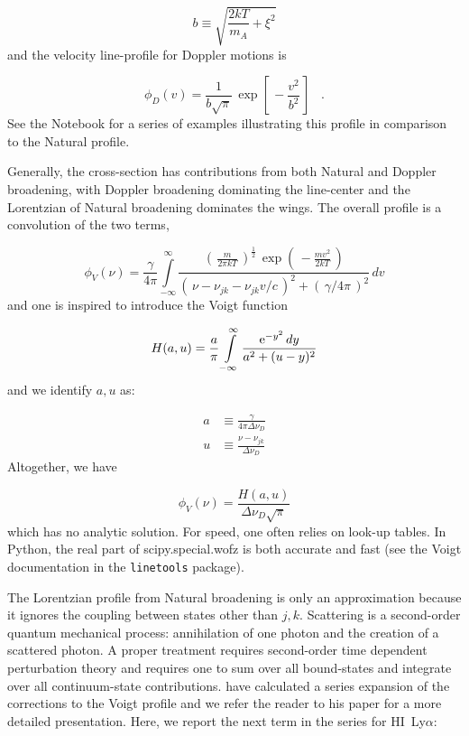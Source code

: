\documentclass[graybox]{svmult}
\newcommand{\HI}{H{\sc I}}
\def\lya{Ly$\alpha$}
\def\ohf{\frac{1}{2}}
\def\ltk{\left [ \,}
\def\ltp{\left ( \,}
\def\rtk{\, \right  ] }
\def\rtp{\, \right  ) }
\def\perd{\;\;\; .}
\def\intl{\int\limits}
\def\rme{{\rm e}}
\begin{document}
\begin{equation}
b \equiv \sqrt{\frac{2kT}{m_A} + \xi^2}
\end{equation}
and the velocity line-profile for Doppler motions is

\begin{equation}
\phi_D(v) = \frac{1}{b\sqrt{\pi}} \, \exp \ltk -\frac{v^2}{b^2} \rtk \perd
\label{eqn:phi_Dv}
\end{equation}
See the Notebook for a series of examples illustrating this
profile in comparison to the Natural profile.


Generally, the cross-section has contributions from both
Natural and Doppler broadening,
with Doppler broadening dominating the line-center 
and the Lorentzian of Natural broadening dominates the wings.
The overall profile is a convolution of the two terms,

\begin{equation}
\phi_V(\nu) = \frac{\gamma}{4\pi} \intl_{-\infty}^\infty
\frac{ \ltp \frac{m}{2\pi kT} \rtp^\ohf \, \exp \ltp - \frac{mv^2}{2kT} \rtp}
{\ltp \nu-\nu_{jk}-\nu_{jk}v/c \rtp^2 + \ltp \gamma/4\pi \rtp^2} \, dv
\end{equation}
and one is inspired to introduce the Voigt function

\begin{equation}
H(a,u) = \frac{a}{\pi} \intl_{-\infty}^\infty 
\frac{\rme^{-y^2} \, dy}{a^2 + (u-y)^2}
\end{equation}
and we identify $a,u$ as:

\begin{align}
a &\equiv \frac{\gamma}{4\pi \Delta\nu_D} \\
u &\equiv \frac{\nu-\nu_{jk}}{\Delta\nu_D}
\end{align}
Altogether, we have 

\begin{equation}
\phi_V(\nu) = \frac{H(a,u)}{\Delta\nu_D \sqrt{\pi}}
\end{equation}
which has no analytic solution.
For speed, one often relies on look-up tables.
In Python, the real part of scipy.special.wofz is both accurate 
and fast (see the Voigt documentation in the {\tt linetools} package).

The Lorentzian profile from Natural broadening is only an approximation
because it ignores the coupling between states other than $j,k$.
Scattering is a second-order quantum mechanical process: annihilation of 
one photon and the creation of a scattered photon.
A proper treatment requires second-order time dependent perturbation
theory and requires one to sum over all bound-states and integrate over
all continuum-state contributions.
\cite{lee03} have calculated a series expansion of the corrections
to the Voigt profile and we refer the reader to his paper for a
more detailed presentation.  Here, we report the next term
in the series for \HI\ \lya:
\end{document}
